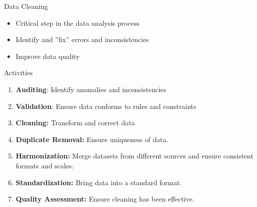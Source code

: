 \documentclass[ignorenonframetext,xcolor=x11names]{beamer}
\begin{document}
\begin{frame}[label=full]{Data Cleaning}
\begin{itemize}
  \item Critical step in the data analysis process
  \item Identify and ''fix'' errors and inconsistencies
  \item Improve data quality
\end{itemize}

\begin{block}{Activities}
\begin{enumerate}
    \item \textbf{Auditing}: Identify anomalies and inconsistencies

    \item \textbf{Validation}: Ensure data conforms to rules and constraints

    \item \textbf{Cleaning:} Transform and correct data

    \item \textbf{Duplicate Removal:} Ensure uniqueness of data.

    \item \textbf{Harmonization:} Merge datasets from different sources and ensure consistent formats and scales.

    \item \textbf{Standardization:} Bring data into a standard format.

    \item \textbf{Quality Assessment:} Ensure cleaning has been effective.
\end{enumerate}
\end{block}
\end{frame}
\end{document}
